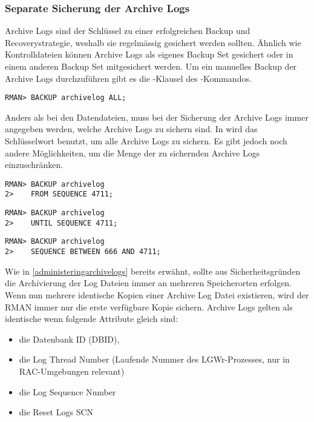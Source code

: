         \subsubsection{Separate Sicherung der Archive Logs}
          Archive Logs sind der Schl\"ussel zu einer erfolgreichen Backup und Recoverystrategie, weshalb sie regelm\"assig gesichert werden sollten. \"Ahnlich wie Kontrolldateien k\"onnen Archive Logs als eigenes Backup Set gesichert oder in einem anderen Backup Set mitgesichert werden. Um ein manuelles Backup der Archive Logs durchzuf\"uhren gibt es die -Klausel des -Kommandos.
          \begin{lstlisting}[caption={Manuelles Backup aller Archive Logs},label=admin1316,language=rman]
RMAN> BACKUP archivelog ALL;
          \end{lstlisting}
          Anders als bei den Datendateien, muss bei der Sicherung der Archive Logs immer angegeben werden, welche Archive Logs zu sichern sind. In  wird das Schl\"usselwort  benutzt, um alle Archive Logs zu sichern. Es gibt jedoch noch andere M\"oglichkeiten, um die Menge der zu sichernden Archive Logs einzuschr\"anken.
          \begin{lstlisting}[caption={Alle Archive Logs ab Sequenz Nummer 4711 sichern},label=admin1317,language=rman]
RMAN> BACKUP archivelog
2>    FROM SEQUENCE 4711;
          \end{lstlisting}
          \begin{lstlisting}[caption={Alle Archive Logs bis Sequenz Nummer 4711 sichern},label=admin1318,language=rman]
RMAN> BACKUP archivelog
2>    UNTIL SEQUENCE 4711;
          \end{lstlisting}
          \begin{lstlisting}[caption={Alle Archive Logs zwischen Sequenz Nummer 666 und 4711 sichern},label=admin1319,language=rman]
RMAN> BACKUP archivelog
2>    SEQUENCE BETWEEN 666 AND 4711;
          \end{lstlisting}
          Wie in \ref{administeringarchivelogs} bereits erw\"ahnt, sollte aus Sicherheitsgr\"unden die Archivierung der Log Dateien immer an mehreren Speicherorten erfolgen. Wenn nun mehrere identische Kopien einer Archive Log Datei existieren, wird der RMAN immer nur die erste verf\"ugbare Kopie sichern. Archive Logs gelten als identische wenn folgende Attribute gleich sind:
          \begin{itemize}
            \item die Datenbank ID (DBID),
            \item die Log Thread Number (Laufende Nummer des LGWr-Prozesses, nur in RAC-Umgebungen relevant)
            \item die Log Sequence Number
            \item die Reset Logs SCN
          \end{itemize}
